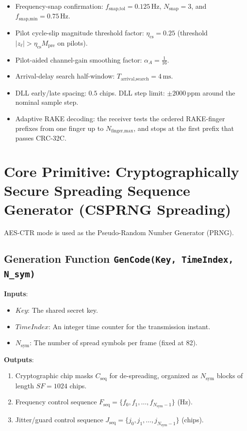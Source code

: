 \documentclass[11pt]{article}
\begin{document}
\begin{itemize}
\begin{itemize}
  \item Frequency-snap confirmation: $f_{\text{snap,tol}}=0.125\,\text{Hz}$, $N_{\text{snap}}=3$, and $f_{\text{snap,min}}=0.75\,\text{Hz}$.
  \item Pilot cycle-slip magnitude threshold factor: $\eta_{\text{cs}}=0.25$ (threshold $|z_\ell|>\eta_{\text{cs}}M_{\text{pre}}$ on pilots).
  \item Pilot-aided channel-gain smoothing factor: $\alpha_A=\frac{1}{16}$.
  \item Arrival-delay search half-window: $T_{\text{arrival,search}}=4\,\text{ms}$.
  \item DLL early/late spacing: $0.5$ chips. DLL step limit: $\pm 2000\,\mathrm{ppm}$ around the nominal sample step.
  \item Adaptive RAKE decoding: the receiver tests the ordered RAKE-finger prefixes from one
    finger up to $N_{\text{finger,max}}$, and stops at the first prefix that passes CRC-32C.
  \end{itemize}
\end{itemize}

\section{Core Primitive: Cryptographically Secure Spreading Sequence Generator (CSPRNG Spreading)}

AES-CTR mode is used as the Pseudo-Random Number Generator (PRNG).

\subsection{Generation Function \texttt{GenCode(Key, TimeIndex, N\_sym)}}

\textbf{Inputs}:
\begin{itemize}
\item $\mathit{Key}$: The shared secret key.
\item $\mathit{TimeIndex}$: An integer time counter for the transmission instant.
\item $N_{\text{sym}}$: The number of spread symbols per frame (fixed at 82).
\end{itemize}

\textbf{Outputs}:
\begin{enumerate}
\item Cryptographic chip masks $C_{\text{seq}}$ for de-spreading, organized as $N_{\text{sym}}$ blocks of length $\mathit{SF}=1024$ chips.
\item Frequency control sequence $F_{\text{seq}}=\{f_0,f_1,\dots,f_{N_{\text{sym}}-1}\}$ (Hz).
\item Jitter/guard control sequence $J_{\text{seq}}=\{j_0,j_1,\dots,j_{N_{\text{sym}}-1}\}$ (chips).
\end{enumerate}
\end{document}
